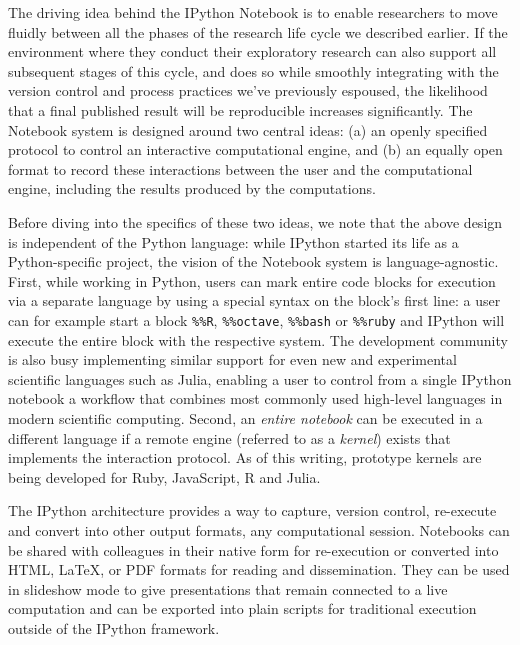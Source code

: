 \documentclass[ChapterTOCs,krantz2]{krantz} %
\begin{document}
The driving idea behind the IPython Notebook is to enable researchers to move
fluidly between all the phases of the research life cycle we described earlier.
If the environment where they conduct their exploratory research can also
support all subsequent stages of this cycle, and does so while smoothly
integrating with the version control and process practices we've previously
espoused, the likelihood that a final published result will be reproducible
increases significantly.  The Notebook system is designed around two central
ideas: (a) an openly specified protocol to control an interactive computational
engine, and (b) an equally open format to record these interactions between the
user and the computational engine, including the results produced by the
computations.

Before diving into the specifics of these two ideas, we note that the above
design is independent of the Python language: while IPython started its life as
a Python-specific project, the vision of the Notebook system is
language-agnostic.  First, while working in Python, users can mark entire code
blocks for execution via a separate language by using a special syntax on the
block's first line: a user can for example start a block \texttt{\%\%R},
\texttt{\%\%octave}, \texttt{\%\%bash} or \texttt{\%\%ruby} and IPython will
execute the entire block with the respective system.  The development community
is also busy implementing similar support for even new and experimental
scientific languages such as Julia, enabling a user to control from a single
IPython notebook a workflow that combines most commonly used high-level
languages in modern scientific computing.  Second, an \emph{entire notebook}
can be executed in a different language if a remote engine (referred to as a
\emph{kernel}) exists that implements the interaction protocol.  As of this
writing, prototype kernels are being developed for Ruby, JavaScript, R and
Julia.

The IPython architecture provides a way to capture, version control, re-execute
and convert into other output formats, any computational session.  Notebooks
can be shared with colleagues in their native form for re-execution or
converted into HTML, \LaTeX, or PDF formats for reading and dissemination.  They
can be used in slideshow mode to give presentations that remain connected to a
live computation and can be exported into plain scripts for traditional
execution outside of the IPython framework.
\end{document}
